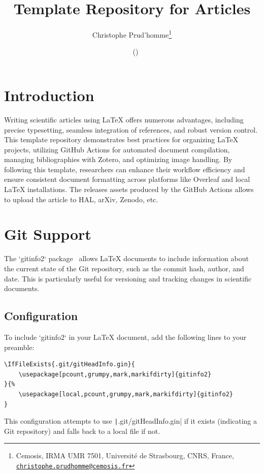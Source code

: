 \documentclass[a4paper]{article}
\title{Template Repository for Articles}
\author{Christophe Prud'homme\thanks{Cemosis, IRMA UMR 7501, Université de Strasbourg, CNRS, France, \tt \href{mailto:christophe.prudhomme@cemosis.fr}{christophe.prudhomme@cemosis.fr}}}
\date{\gitReln\  \gitAuthorDate\ (\gitAbbrevHash)}
\begin{document}
\maketitle
\tableofcontents

\section{Introduction}
\label{sec:introduction}

Writing scientific articles using \LaTeX{} offers numerous advantages, including precise typesetting, seamless integration of references, and robust version control.
This template repository demonstrates best practices for organizing \LaTeX{} projects, utilizing GitHub Actions for automated document compilation, managing bibliographies with Zotero, and optimizing image handling.
By following this template, researchers can enhance their workflow efficiency and ensure consistent document formatting across platforms like Overleaf and local \LaTeX{} installations.
The releases assets produced by the GitHub Actions allows to upload the article to HAL, arXiv, Zenodo, etc.



\section{Git Support}
\label{sec:git-support}

The `gitinfo2` package~\citep{brent_longborough_gitinfo2sty_2015} allows \LaTeX{} documents to include information about the current state of the Git repository, such as the commit hash, author, and date. This is particularly useful for versioning and tracking changes in scientific documents.

\subsection{Configuration}

To include `gitinfo2` in your \LaTeX{} document, add the following lines to your preamble:

\begin{verbatim}
\IfFileExists{.git/gitHeadInfo.gin}{
    \usepackage[pcount,grumpy,mark,markifdirty]{gitinfo2}
}{%
    \usepackage[local,pcount,grumpy,mark,markifdirty]{gitinfo2}
}
\end{verbatim}

This configuration attempts to use \texttt|.git/gitHeadInfo.gin| if it exists (indicating a Git repository) and falls back to a local file if not.
\end{document}

